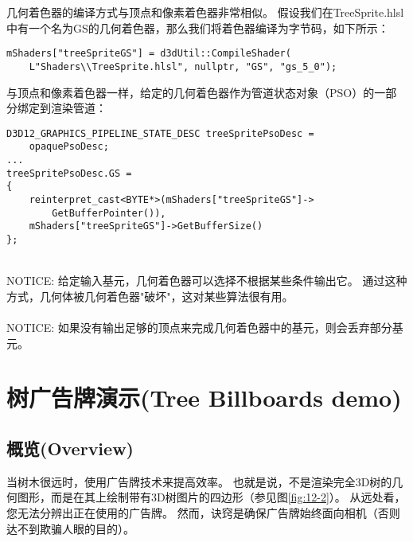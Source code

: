 \begin{flushleft}
几何着色器的编译方式与顶点和像素着色器非常相似。 假设我们在TreeSprite.hlsl中有一个名为GS的几何着色器，那么我们将着色器编译为字节码，如下所示：\\
\end{flushleft}

\begin{lstlisting}
mShaders["treeSpriteGS"] = d3dUtil::CompileShader(
    L"Shaders\\TreeSprite.hlsl", nullptr, "GS", "gs_5_0");
\end{lstlisting}

\begin{flushleft}
与顶点和像素着色器一样，给定的几何着色器作为管道状态对象（PSO）的一部分绑定到渲染管道：\\
\end{flushleft}

\begin{lstlisting}
D3D12_GRAPHICS_PIPELINE_STATE_DESC treeSpritePsoDesc =
    opaquePsoDesc;
...
treeSpritePsoDesc.GS =
{
    reinterpret_cast<BYTE*>(mShaders["treeSpriteGS"]->
        GetBufferPointer()),
    mShaders["treeSpriteGS"]->GetBufferSize()
};
\end{lstlisting}

\begin{flushleft}
~\\
NOTICE: 给定输入基元，几何着色器可以选择不根据某些条件输出它。 通过这种方式，几何体被几何着色器"破坏"，这对某些算法很有用。\\
~\\

NOTICE: 如果没有输出足够的顶点来完成几何着色器中的基元，则会丢弃部分基元。\\
\end{flushleft}

\section{树广告牌演示(Tree Billboards demo)}
\subsection{概览(Overview)}
\begin{flushleft}
当树木很远时，使用广告牌技术来提高效率。 也就是说，不是渲染完全3D树的几何图形，而是在其上绘制带有3D树图片的四边形（参见图\ref{fig:12-2}）。 从远处看，您无法分辨出正在使用的广告牌。 然而，诀窍是确保广告牌始终面向相机（否则达不到欺骗人眼的目的）。
\end{flushleft}

